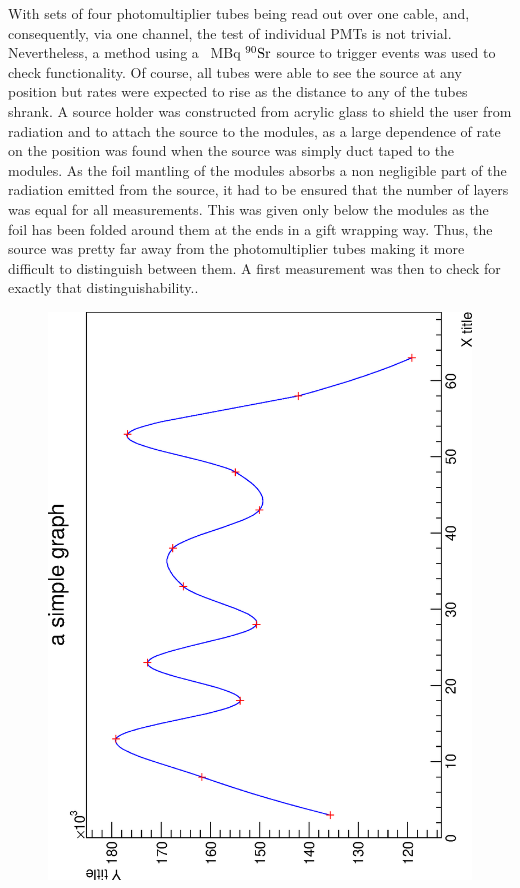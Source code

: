   With sets of four photomultiplier tubes being read out over one cable, and, consequently, via one channel, the test of individual PMTs is not trivial. Nevertheless, a method using a \SI{}{\mega\becquerel} $\rm ^{90}Sr$ source to trigger events was used to check functionality. Of course, all tubes were able to see the source at any position but rates were expected to rise as the distance to any of the tubes shrank. A source holder was constructed from acrylic glass to shield the user from radiation and to attach the source to the modules, as a large dependence of rate on the position was found when the source was simply duct taped to the modules. As the foil mantling of the modules absorbs a non negligible part of the radiation emitted from the source, it had to be ensured that the number of layers was equal for all measurements. This was given only below the modules as the foil has been folded around them at the ends in a gift wrapping way. Thus, the source was pretty far away from the photomultiplier 
tubes making it more difficult to distinguish between them. A first measurement was then to check for exactly that distinguishability..
  \begin{figure}
  	\includegraphics[angle = -90, width = 0.9 \textwidth]{graphics/cobalt/876_parallel_good.eps}
  	\caption[Rate scanning with cobalt source]{}
  \end{figure}

